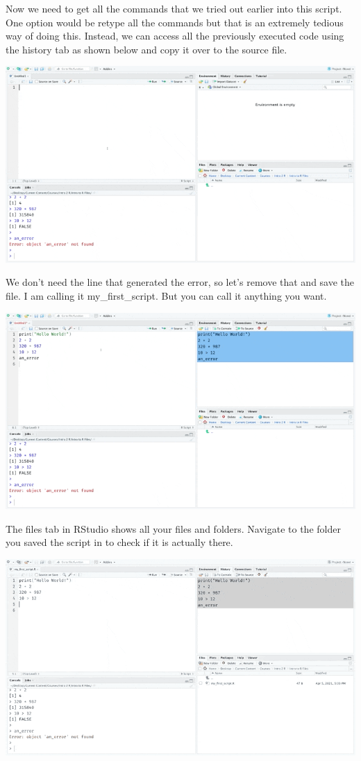 \documentclass[
]{book}
\begin{document}
Now we need to get all the commands that we tried out earlier into this script. One option would be retype all the commands but that is an extremely tedious way of doing this. Instead, we can access all the previously executed code using the history tab as shown below and copy it over to the source file.

\includegraphics{assets/ch_1-setup/gifs/history.gif}

We don't need the line that generated the error, so let's remove that and save the file. I am calling it my\_first\_script. But you can call it anything you want.

\includegraphics{assets/ch_1-setup/gifs/save_file.gif}

The files tab in RStudio shows all your files and folders. Navigate to the folder you saved the script in to check if it is actually there.

\includegraphics{assets/ch_1-setup/gifs/saved_file.gif}
\end{document}
